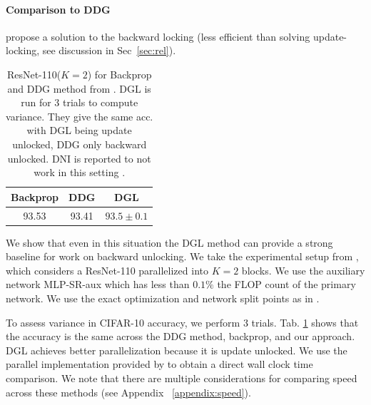 \documentclass{article}
\begin{document}

\paragraph{Comparison to DDG} \citet{ddg} propose a solution to the backward locking (less efficient than solving update-locking, see discussion in Sec~\ref{sec:rel}). 
\begin{table}
    \center\begin{tabular}{|c|c|c|}
        \hline
           Backprop &  DDG & DGL  \\\hline
           93.53 &  93.41 & $93.5\pm0.1$ \\\hline
    \end{tabular}
    \caption{ResNet-110($K=2$) for Backprop and DDG method  from \citep{ddg}. DGL is run for 3 trials to compute variance. They give the same acc. with DGL being update unlocked, DDG only backward unlocked. DNI is reported to not work in this setting \citep{ddg}.}\vspace{2pt}
    \label{tab:ddg_comp}
\end{table}
We show that even in this situation the DGL method can provide a strong  baseline for work on backward unlocking. We take the experimental setup from \citep{ddg}, which considers a ResNet-110 parallelized into $K=2$ blocks. 
We use the auxiliary network MLP-SR-aux which has less than $0.1\%$ the FLOP count of the primary network. We use the exact optimization and network split points as in \citep{ddg}. 
 
To assess variance in  CIFAR-10 accuracy, we perform 3 trials. Tab. \ref{tab:ddg_comp} shows that the accuracy is the same across the DDG method, backprop, and our approach. DGL achieves better parallelization because it is update unlocked. We use the parallel implementation provided by \citep{ddg} to obtain a direct wall clock time comparison. We note that there are multiple considerations for comparing speed across these methods (see Appendix ~\ref{appendix:speed}). 
\end{document}
